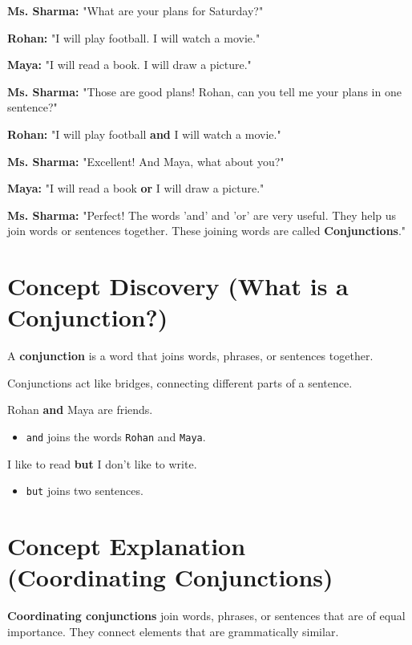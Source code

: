 \textbf{Ms. Sharma:} "What are your plans for Saturday?"

\textbf{Rohan:} "I will play football. I will watch a movie."

\textbf{Maya:} "I will read a book. I will draw a picture."

\textbf{Ms. Sharma:} "Those are good plans! Rohan, can you tell me your plans in one sentence?"

\textbf{Rohan:} "I will play football \textbf{and} I will watch a movie."

\textbf{Ms. Sharma:} "Excellent! And Maya, what about you?"

\textbf{Maya:} "I will read a book \textbf{or} I will draw a picture."

\textbf{Ms. Sharma:} "Perfect! The words 'and' and 'or' are very useful. They help us join words or sentences together. These joining words are called \textbf{Conjunctions}."

\section{Concept Discovery (What is a Conjunction?)}
A \textbf{conjunction} is a word that joins words, phrases, or sentences together.

Conjunctions act like bridges, connecting different parts of a sentence.

\begin{examplebox}
    Rohan \textbf{and} Maya are friends.
    \begin{itemize}
        \item \texttt{and} joins the words \texttt{Rohan} and \texttt{Maya}.
    \end{itemize}
\end{examplebox}

\begin{examplebox}
    I like to read \textbf{but} I don't like to write.
    \begin{itemize}
        \item \texttt{but} joins two sentences.
    \end{itemize}
\end{examplebox}

\section{Concept Explanation (Coordinating Conjunctions)}
\textbf{Coordinating conjunctions} join words, phrases, or sentences that are of equal importance. They connect elements that are grammatically similar.


